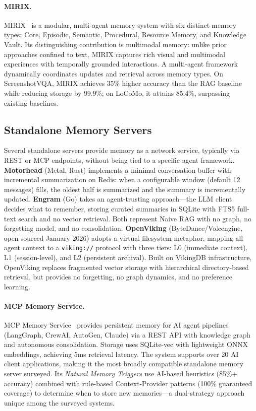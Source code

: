 \paragraph{MIRIX.}
MIRIX~\cite{wang2025mirix} is a modular, multi-agent memory system with
six distinct memory types: Core, Episodic, Semantic, Procedural, Resource
Memory, and Knowledge Vault.  Its distinguishing contribution is
multimodal memory: unlike prior approaches confined to text, MIRIX
captures rich visual and multimodal experiences with temporally grounded
interactions.  A multi-agent framework dynamically coordinates updates
and retrieval across memory types.  On ScreenshotVQA, MIRIX achieves
35\% higher accuracy than the RAG baseline while reducing storage by
99.9\%; on LoCoMo, it attains 85.4\%, surpassing existing baselines.

\subsection{Standalone Memory Servers}
\label{sec:standalone}

Several standalone servers provide memory as a network service,
typically via REST or MCP endpoints, without being tied to a specific
agent framework. \textbf{Motorhead} (Metal, Rust) implements a
minimal conversation buffer with incremental summarization on Redis:
when a configurable window (default 12 messages) fills, the oldest
half is summarized and the summary is incrementally updated.
\textbf{Engram} (Go) takes an agent-trusting approach---the LLM
client decides what to remember, storing curated summaries in SQLite
with FTS5 full-text search and no vector retrieval. Both represent
Naive RAG with no graph, no forgetting model, and no consolidation.
\textbf{OpenViking} (ByteDance/Volcengine, open-sourced January 2026)
adopts a virtual filesystem metaphor, mapping all agent context to a
\texttt{viking://} protocol with three tiers: L0 (immediate context),
L1 (session-level), and L2 (persistent archival). Built on VikingDB
infrastructure, OpenViking replaces fragmented vector storage with
hierarchical directory-based retrieval, but provides no forgetting,
no graph dynamics, and no preference learning.

\paragraph{MCP Memory Service.}
MCP Memory Service~\cite{doobidoo2026mcp} provides persistent memory
for AI agent pipelines (LangGraph, CrewAI, AutoGen, Claude) via a REST
API with knowledge graph and autonomous consolidation.  Storage uses
SQLite-vec with lightweight ONNX embeddings, achieving 5ms retrieval
latency.  The system supports over 20 AI client applications, making it
the most broadly compatible standalone memory server surveyed.  Its
\emph{Natural Memory Triggers} use AI-based heuristics (85\%+ accuracy)
combined with rule-based Context-Provider patterns (100\% guaranteed
coverage) to determine when to store new memories---a dual-strategy
approach unique among the surveyed systems.

